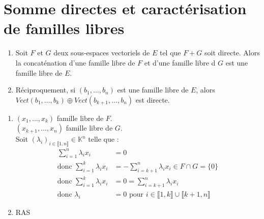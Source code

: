 \documentclass[../main.tex]{subfiles}
\begin{document}
\section{Somme directes et caractérisation de familles libres}
\begin{tcolorbox}[title=Propostion 20.65, title filled=false, colframe=lightblue, colback=lightblue!10!white]
    \begin{enumerate}
        \item Soit $F$ et $G$ deux sous-espaces vectoriels de $E$ tel que $F+G$ soit directe. Alors la concaténation d'une famille libre de $F$ et d'une famille libre d $G$ est une famille libre de $E$. 
        \item Réciproquement, si $(b_1, \ldots, b_n)$ est une famille libre de $E$, alors $Vect(b_1, \ldots, b_k) \oplus Vect(b_{k+1}, \ldots, b_n)$ est directe. 
    \end{enumerate}
\end{tcolorbox}

\begin{enumerate}
    \item $(x_1, \ldots, x_k)$ famille libre de $F$. \\
    $(x_{k+1}, \ldots, x_n)$ famille libre de $G$. \\
    Soit $(\lambda_i)_{i\in \llbracket 1, n \rrbracket} \in \mathbb{K}^n$ telle que : 
    \begin{align*}
        \sum_{i=1}^{n} \lambda_i x_i &= 0 \\
        \text{donc } \sum_{i=1}^{k} \lambda_i x_i &= -\sum_{i=k+1}^{n} \lambda_i x_i \in F \cap G = \{0\} \\
        \text{donc } \sum_{i=1}^{k} \lambda_i x_i &= 0 = \sum_{i = k+1}^{n} \lambda_i x_i \\
        \text{donc } \lambda_i &= 0 \text{ pour } i\in \llbracket 1, k \rrbracket \cup \llbracket k+1, n \rrbracket
    \end{align*}

    \item RAS
\end{enumerate}

\end{document}
